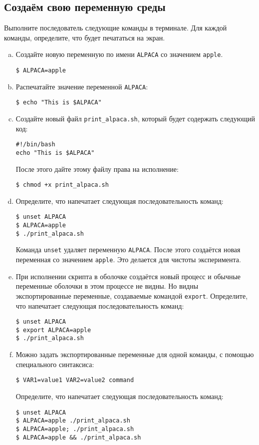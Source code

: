 \documentclass{article}
\begin{document}
\subsection{Создаём свою переменную среды}
Выполните последователь следующие команды в терминале. Для каждой команды, определите, что будет печататься на экран.
\begin{enumerate}[(a)]
\item Создайте новую переменную по имени \texttt{ALPACA} со значением \texttt{apple}.
\begin{lstlisting}
$ ALPACA=apple
\end{lstlisting}

\item Распечатайте значение переменной \texttt{ALPACA}:
\begin{lstlisting}
$ echo "This is $ALPACA"
\end{lstlisting}

\item Создайте новый файл \texttt{print\_alpaca.sh}, который будет содержать следующий код:
\begin{lstlisting}
#!/bin/bash
echo "This is $ALPACA"
\end{lstlisting}
После этого дайте этому файлу права на исполнение:
\begin{lstlisting}
$ chmod +x print_alpaca.sh
\end{lstlisting}

\item Определите, что напечатает следующая последовательность команд:
\begin{lstlisting}
$ unset ALPACA
$ ALPACA=apple
$ ./print_alpaca.sh
\end{lstlisting}
Команда \texttt{unset} удаляет переменную \texttt{ALPACA}. После этого создаётся новая переменная со значением \texttt{apple}. Это делается для чистоты эксперимента.

\item При исполнении скрипта в оболочке создаётся новый процесс и обычные переменные оболочки в этом процессе не видны. Но видны экспортированные переменные, создаваемые командой \texttt{export}. Определите, что напечатает следующая последовательность команд:
\begin{lstlisting}
$ unset ALPACA
$ export ALPACA=apple
$ ./print_alpaca.sh
\end{lstlisting}


\item Можно задать экспортированные переменные для одной команды, с помощью специального синтаксиса:
\begin{lstlisting}
$ VAR1=value1 VAR2=value2 command
\end{lstlisting}
Определите, что напечатает следующая последовательность команд:
\begin{lstlisting}
$ unset ALPACA
$ ALPACA=apple ./print_alpaca.sh
$ ALPACA=apple; ./print_alpaca.sh
$ ALPACA=apple && ./print_alpaca.sh
\end{lstlisting}


\end{enumerate}
\end{document}
